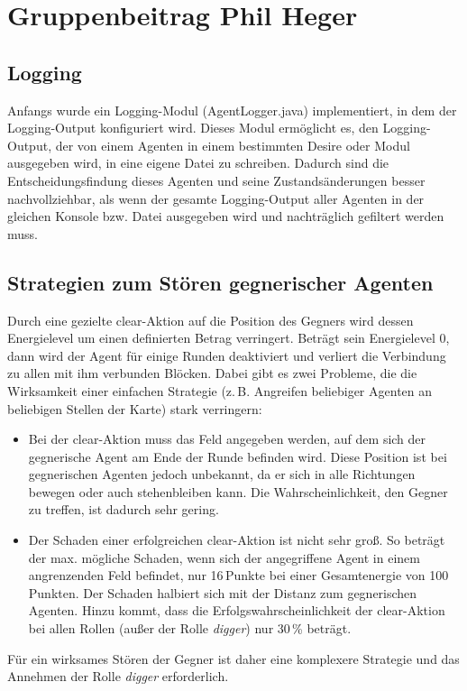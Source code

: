 \documentclass[runningheads]{llncs}
\begin{document}
	\section{Gruppenbeitrag Phil Heger}
	\subsection{Logging}
	Anfangs wurde ein Logging-Modul (AgentLogger.java) implementiert, in dem der Logging-Output konfiguriert wird. Dieses Modul ermöglicht es, den Logging-Output, der von einem Agenten in einem bestimmten Desire oder Modul ausgegeben wird, in eine eigene Datei zu schreiben. Dadurch sind die Entscheidungsfindung dieses Agenten und seine Zustandsänderungen besser nachvollziehbar, als wenn der gesamte Logging-Output aller Agenten in der gleichen Konsole bzw. Datei ausgegeben wird und nachträglich gefiltert werden muss. 
	
	\subsection{Strategien zum Stören gegnerischer Agenten}
	Durch eine gezielte clear-Aktion auf die Position des Gegners wird dessen Energielevel um einen definierten Betrag verringert. Beträgt sein Energielevel 0, dann wird der Agent für einige Runden deaktiviert und verliert die Verbindung zu allen mit ihm verbunden Blöcken. Dabei gibt es zwei Probleme, die die Wirksamkeit einer einfachen Strategie (z.\,B. Angreifen beliebiger Agenten an beliebigen Stellen der Karte) stark verringern:
	\begin{itemize}
		\item{Bei der clear-Aktion muss das Feld angegeben werden, auf dem sich der gegnerische Agent am Ende der Runde befinden wird. Diese Position ist bei gegnerischen Agenten jedoch unbekannt, da er sich in alle Richtungen bewegen oder auch stehenbleiben kann. Die Wahrscheinlichkeit, den Gegner zu treffen, ist dadurch sehr gering.}
		\item{Der Schaden einer erfolgreichen clear-Aktion ist nicht sehr groß. So beträgt der max. mögliche Schaden, wenn sich der angegriffene Agent in einem angrenzenden Feld befindet, nur 16\,Punkte bei einer Gesamtenergie von 100\,Punkten. Der Schaden halbiert sich mit der Distanz zum gegnerischen Agenten. Hinzu kommt, dass die Erfolgswahrscheinlichkeit der clear-Aktion bei allen Rollen (außer der Rolle \textit{digger}) nur 30\,\% beträgt.}
	\end{itemize}
	Für ein wirksames Stören der Gegner ist daher eine komplexere Strategie und das Annehmen der Rolle \textit{digger} erforderlich.
\end{document}
